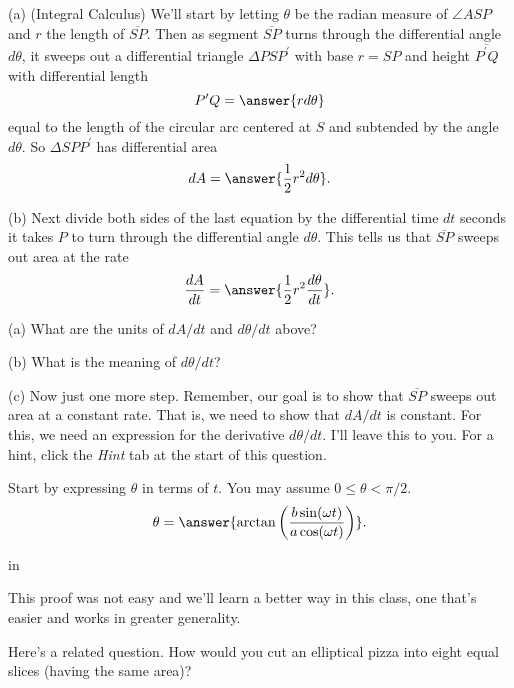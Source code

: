 \documentclass{ximera}
\newcommand{\pskip}{\vskip 0.1 in}
\begin{document}
\begin{question}  \label{Qdf4t5tht5544}
(a) (Integral Calculus) We'll start by letting $\theta$ be the radian measure of $\angle ASP$ and $r$ the length of $\overline{SP}$. Then as segment $\overline{SP}$ turns through the differential angle $d\theta$, it sweeps out
a differential triangle $\Delta PSP^\prime$  with base $r=SP$ and height $\overline{P^\prime Q}$ with differential length
\[
             P^\prime Q = \answer{r d\theta}
\]
equal to the length of the circular arc centered at $S$ and subtended by the angle $d\theta$. So $\Delta SPP^\prime$ has differential area
\[
    dA = \answer{\frac{1}{2}r^2 d\theta} .
\]

(b) Next divide both sides of the last equation by the differential time $dt$ seconds it takes $P$ to turn through the differential angle $d\theta$. This tells us that $\overline{SP}$ sweeps out area at the rate
\[
  \frac{dA}{dt} = \answer{\frac{1}{2}r^2 \frac{d\theta}{dt}} .
\]

\begin{freeResponse}
(a) What are the units of $dA/dt$ and $d\theta/dt$ above? 

(b) What is the meaning of $d\theta/dt$?
\end{freeResponse}

(c) Now just one more step. Remember, our goal is to show that $\overline{SP}$ sweeps out area at a constant rate. That is, we need to show that $dA/dt$ is constant. For this, we need an expression for the derivative $d\theta/dt$. I'll leave this to you. For a hint, click the \emph{Hint} tab at the start of this question.

\begin{hint}
Start by expressing $\theta$ in terms of $t$. You may assume $0 \leq \theta < \pi/2$. 
\[
    \theta = \answer{\arctan\left( \frac{b\sin (\omega t)}{a \cos (\omega t)}\right)} .
\]
\end{hint}

\pskip

This proof was not easy and we'll learn a better way in this class, one that's easier and works in greater generality.

\begin{freeResponse}   \label{Q:L98d7g33}
Here's a related question. How would you cut an elliptical pizza into eight equal slices (having the same area)?
\end{freeResponse}


\end{question}
\end{document}

